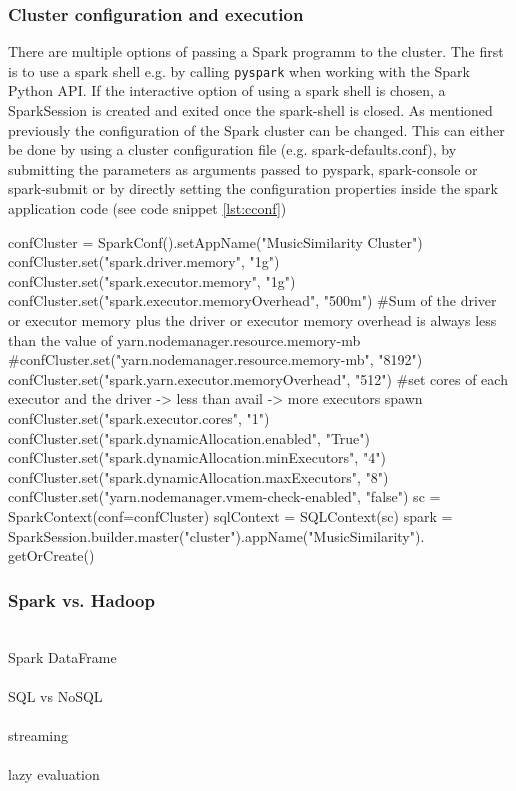 \subsubsection{Cluster configuration and execution}\label{cconfexp}


There are multiple options of passing a Spark programm to the cluster. The first is to use a spark shell e.g. by calling \lstinline{pyspark} when working with the Spark Python API. If the interactive option of using a spark shell is chosen, a SparkSession is created and exited once the spark-shell is closed. 
As mentioned previously the configuration of the Spark cluster can be changed. This can either be done by using a cluster configuration file (e.g. spark-defaults.conf), by submitting the parameters as arguments passed to pyspark, spark-console or spark-submit or by directly setting the configuration properties inside the spark application code (see code snippet \ref{lst:cconf})\\


\begin{pythonCode}[frame=single,label={lst:cconf},caption={example cluster configuration python},captionpos=b]
confCluster = SparkConf().setAppName("MusicSimilarity Cluster")
confCluster.set("spark.driver.memory", "1g")
confCluster.set("spark.executor.memory", "1g")
confCluster.set("spark.executor.memoryOverhead", "500m")
#Sum of the driver or executor memory plus the driver or executor memory overhead is always less than the value of yarn.nodemanager.resource.memory-mb
#confCluster.set("yarn.nodemanager.resource.memory-mb", "8192")
confCluster.set("spark.yarn.executor.memoryOverhead", "512")
#set cores of each executor and the driver -> less than avail -> more executors spawn
confCluster.set("spark.executor.cores", "1")
confCluster.set("spark.dynamicAllocation.enabled", "True")
confCluster.set("spark.dynamicAllocation.minExecutors", "4")
confCluster.set("spark.dynamicAllocation.maxExecutors", "8")
confCluster.set("yarn.nodemanager.vmem-check-enabled", "false")
sc = SparkContext(conf=confCluster)
sqlContext = SQLContext(sc)
spark = SparkSession.builder.master("cluster").appName("MusicSimilarity").
	getOrCreate()
\end{pythonCode}

\subsubsection{Spark vs. Hadoop}

\ \\
Spark DataFrame\\
\ \\
SQL vs NoSQL\\
\ \\
streaming\\
\ \\
lazy evaluation\\

